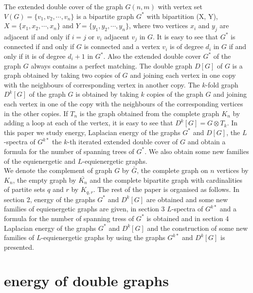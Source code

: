 \documentclass[12pt,a4paper]{amsart}
\theoremstyle{theorem}
\theoremstyle{definition}
\numberwithin{equation}{section} \makeatletter
\begin{document}
\indent The extended double cover \cite{c} of the graph $G(n,m)$ with vertex set $V(G)=\{v_1, v_2, \cdots, v_n\}$ is  a bipartite graph $G^*$ with bipartition (X, Y), $X=\{x_1, x_2, \cdots, x_n\}$ and $Y=\{y_1, y_2, \cdots, y_n\}$, where two vertices $x_i$ and $y_j$ are adjacent if and only if $i=j$ or $v_i$ adjacent $v_j$ in $G$. It is easy to see that $G^*$ is connected if and only if $G$ is connected and a vertex $v_i$ is of degree $d_i$ in $G$ if and only if it is of degree $d_i+1$ in $G^*$. Also the extended double cover $G^*$ of the graph $G$ always contains a perfect matching. The double graph $D[G]$ of $G$ is a graph obtained by taking two copies of $G$ and joining each vertex in one copy with the neighbours of corresponding vertex in another copy. The $k$-fold graph $D^k[G]$ \cite{ms} of the graph $G$ is obtained by taking $k$ copies of the graph $G$ and joining each vertex in one of the copy with the neighbours of the corresponding vertices in the other copies. If $T_n$ is the graph obtained from the complete graph $K_n$ by adding a loop at each of the vertex, it is easy to see that $D^k[G]=G\otimes T_k$. In this paper we study energy, Laplacian energy of the graphs $G^*$ and $D[G]$, the $L$-spectra of $G^{k*}$ the $k$-th iterated extended double cover of $G$ and obtain a formula for the number of spanning trees of $G^*$. We also obtain some new families of the equienergetic and $L$-equienergetic graphs.\\
\indent  We denote the complement of graph $G$ by $\bar{G}$, the complete graph on $n$ vertices by $K_n$, the empty graph by $\bar{K_n}$ and the complete bipartite graph with cardinalities of partite sets $q$ and $r$ by $K_{q,r}$. The rest of the paper is organised as follows. In section 2, energy of the graphs $G^*$ and $D^k[G]$ are obtained and some new families of equienergetic graphs are given, in section 3 $L$-spectra of $G^{k*}$ and a formula for the number of spanning tress of $G^*$ is obtained and in section 4 Laplacian energy of the graphs $G^*$ and $D^k[G]$ and the construction of some new families of $L$-equienergetic graphs by using the graphs $G^{k*}$ and $D^k[G]$ is presented.

\section{energy of double graphs}
\end{document}
